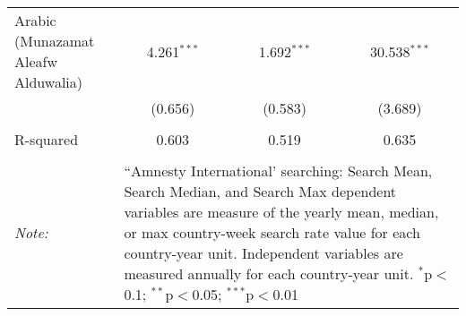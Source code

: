 \begin{table}[!htbp]
\begin{tabular}{@{\extracolsep{5pt}}lccc}
  Arabic (Munazamat Aleafw Alduwalia) & 4.261$^{***}$ & 1.692$^{***}$ & 30.538$^{***}$ \\ 
  & (0.656) & (0.583) & (3.689) \\ 
 \hline \\[-1.8ex] 
R-squared  & 0.603 & 0.519 & 0.635 \\ 
\hline 
\hline \\[-1.8ex] 
\textit{Note:}  & \multicolumn{3}{l}{\parbox[t]{8cm}{``Amnesty International' searching: Search Mean, Search Median, and Search Max dependent variables are measure of the yearly mean, median, or max country-week search rate value for each country-year unit. Independent variables are measured annually for each country-year unit. $^{*}$p$<$0.1; $^{**}$p$<$0.05; $^{***}$p$<$0.01}} \\ 
\end{tabular} 
\end{table} 
